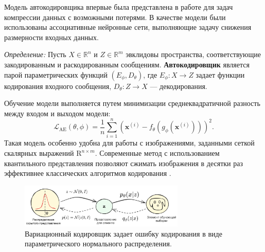 Модель автокодировщика впервые была представлена в работе \cite{kramer1991nonlinear} для задач компрессии данных с возможными потерями. 
В качестве модели были использованы ассоциативные нейронные сети, выполняющие задачу снижения размерности входных данных.

\textit{Определение:} Пусть $X \in \mathbb{R}^n$ и  $Z \in \mathbb{R}^m$ эвклидовы 
пространства, соответствующие закодированным и раскодированным сообщениям. \textbf{Автокодировщик} является парой 
параметрических функций $(E_\phi,D_\theta)$, где $E_\phi: X \rightarrow Z$ задает функции кодирования входного сообщения,
$D_\theta: Z \rightarrow X$ --- декодирования.

Обучение модели выполняется путем минимизации среднеквадратичной разность между входом и выходом модели:
\begin{equation}
    \mathcal{L}_\text{AE}(\theta, \phi) = \frac{1}{n}\sum_{i=1}^n (\mathbf{x}^{(i)} - f_\theta(g_\phi(\mathbf{x}^{(i)})))^2.
\end{equation}
Такая модель особенно удобна для работы с изображениями, заданными сеткой скалярных выражений $\mathrm{R}^{n\times m}$.
Современные метод с использованием квантильного представления позволяют сжимать изображения в десятки раз
эффективнее классических алгоритмов кодирования \cite{ascenso2021white}. 

\begin{figure}[h]
    \centering
    \includegraphics[width=0.7\textwidth]{assets/ml/generation/vae.excalidraw.png}
    \caption{Вариационный кодировщик задает ошибку кодирования в виде параметрического нормального распределения.}
    \label{vae}
\end{figure}

